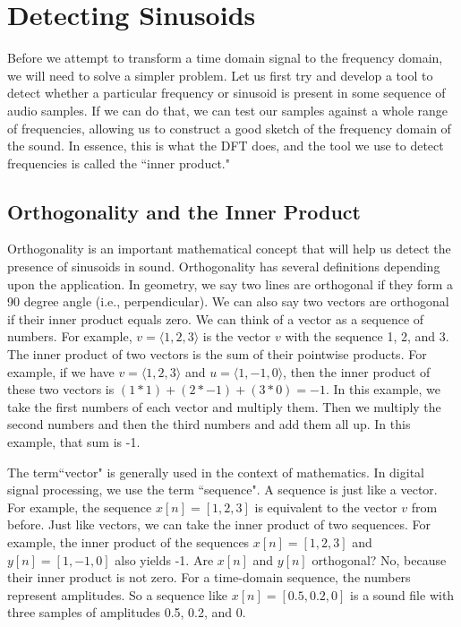 \section*{Detecting Sinusoids}

Before we attempt to transform a time domain signal to the frequency domain, we will need to solve
a simpler problem.  Let us first try and develop a tool to detect whether a particular frequency or
sinusoid is present in some sequence of audio samples.  If we can do that, we can test our samples against
a whole range of frequencies, allowing us to construct a good sketch of the frequency domain of
the sound.  In essence, this is what the DFT does, and the tool we use to detect frequencies is called
the ``inner product."

\subsection*{Orthogonality and the Inner Product}

Orthogonality is an important mathematical concept that will help us detect the presence of sinusoids
in sound.  Orthogonality has several definitions depending upon the application.  In geometry, we say two
lines are orthogonal if they form a 90 degree angle (i.e., perpendicular).  We can also say two vectors are 
orthogonal if their inner product equals zero.  We can think of a vector as a sequence of numbers.  For example,
$v = \langle 1, 2, 3 \rangle$ is the vector $v$ with the sequence 1, 2, and 3.  The inner product of two vectors
is the sum of their pointwise products.  For example, if we have $v = \langle 1, 2, 3 \rangle$ and 
$u = \langle 1, -1, 0 \rangle$, then the inner product of these two vectors is $(1 * 1) + (2 * -1) + (3 * 0) = -1$.
In this example, we take the first numbers of each vector and multiply them.  Then we multiply the second
numbers and then the third numbers and add them all up.  In this example, that sum is -1.  

The term``vector"
is generally used in the context of mathematics.  In digital signal processing, we use the term ``sequence".  A 
sequence is just like a vector.  For example, the sequence $x[n] = [1, 2, 3]$ is equivalent to the
vector $v$ from before.  Just like vectors, we can take the inner product of two sequences.  For example, 
the inner product of the sequences $x[n] = [1, 2, 3]$ and $y[n] = [1, -1, 0]$ also yields -1.  Are $x[n]$ and
$y[n]$ orthogonal?  No, because their inner product is not zero.  For a time-domain 
sequence, the numbers represent amplitudes.  So a sequence like $x[n] = [0.5, 0.2, 0]$ is a sound file with three
samples of amplitudes 0.5, 0.2, and 0.

